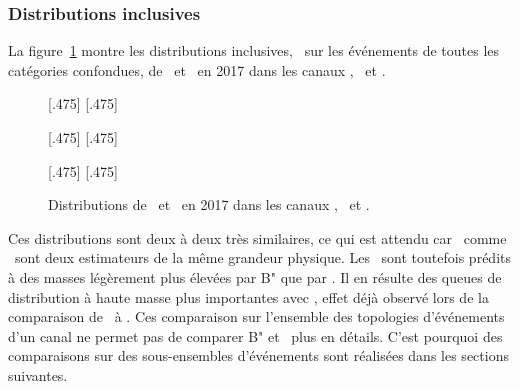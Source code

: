 \subsubsection{Distributions inclusives}
La figure~\ref{fig-svfit_vs_ml_2017}
montre les distributions inclusives, \ie\ sur les événements de toutes les catégories confondues, de \msv\ et \mml\ en 2017 dans les canaux \tauh\tauh, \ele\tauh\ et \ele\mu.
\begin{figure}[p]
\centering

[.475\textwidth]
{}
\hfill
{}[.475\textwidth]
{}

[.475\textwidth]
{}
\hfill
{}[.475\textwidth]
{}

[.475\textwidth]
{}
\hfill
{}[.475\textwidth]
{}

\caption[Distributions de \msv\ et \mml\ dans les canaux \tauh\tauh, \ele\tauh\ et \ele\mu.]{Distributions de \msv\ et \mml\ en 2017 dans les canaux \tauh\tauh, \ele\tauh\ et \ele\mu.}
\label{fig-svfit_vs_ml_2017}
\end{figure}
Ces distributions sont deux à deux très similaires,
ce qui est attendu car \msv\ comme \mml\ sont deux estimateurs de la même grandeur physique.
Les \ftauhs\ sont toutefois prédits à des masses légèrement plus élevées par B" que par \SVFIT.
Il en résulte des queues de distribution à haute masse plus importantes avec \mml,
effet déjà observé lors de la comparaison de \mml\ à \mTtot.
Ces comparaison sur l'ensemble des topologies d'événements d'un canal ne permet pas de comparer B" et \SVFIT\ plus en détails.
C'est pourquoi des comparaisons sur des sous-ensembles d'événements sont réalisées dans les sections suivantes.
